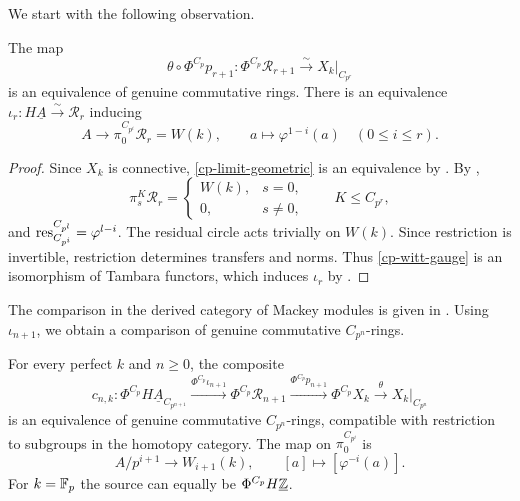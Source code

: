 We start with the following observation.

\begin{proposition}\label{prop:cp-restriction-limit}
The map
\begin{equation}\label{cp-limit-geometric}
\theta\circ\Phi^{C_p}p_{r+1}:
\Phi^{C_p}\mathcal R_{r+1}\xrightarrow{\sim}X_k|_{C_{p^r}}
\end{equation}
is an equivalence of genuine commutative rings. There is an equivalence
$\iota_r:H\underline A\xrightarrow{\sim}\mathcal R_r$ inducing
\begin{equation}\label{cp-witt-gauge}
A\longrightarrow\pi_0^{C_{p^i}}\mathcal R_r=W(k),
\qquad a\longmapsto\varphi^{1-i}(a)
\quad(0\le i\le r).
\end{equation}
\end{proposition}

\begin{proof}
Since $X_k$ is connective, \eqref{cp-limit-geometric} is an
equivalence by \cite[Proposition~5.2, the proof of Corollary~5.4,
and Corollary~5.13]{AN}.
By \cite[Theorem~6.14]{AN},
\[
\pi_s^K\mathcal R_r=
\begin{cases}W(k),&s=0,\\0,&s\ne0,\end{cases}
\qquad K\le C_{p^r},
\]
and $\operatorname{res}_{C_{p^i}}^{C_{p^l}}=\varphi^{l-i}$.
The residual circle acts trivially on $W(k)$.
Since restriction is invertible, restriction determines transfers
and norms. Thus \eqref{cp-witt-gauge} is an isomorphism of
Tambara functors, which induces $\iota_r$ by
\cite[Theorems~5.2--5.3]{Ullman}.
\end{proof}

The comparison in the derived category of Mackey modules is given in
\cite[Theorem~3]{Kriz}. Using $\iota_{n+1}$, we obtain a comparison of
genuine commutative $C_{p^n}$-rings.

\begin{proposition}
\label{prop:cp-normed-comparison}
For every perfect $k$ and $n\geq0$, the composite
\[
c_{n,k}:\Phi^{C_p}H\underline A_{C_{p^{n+1}}}
 \xrightarrow{\Phi^{C_p}\iota_{n+1}}\Phi^{C_p}\mathcal R_{n+1}
 \xrightarrow{\Phi^{C_p}p_{n+1}}\Phi^{C_p}X_k
 \xrightarrow{\theta}X_k|_{C_{p^n}}
\]
is an equivalence of genuine commutative $C_{p^n}$-rings, compatible
with restriction to subgroups in the homotopy category. The map on $\pi_0^{C_{p^i}}$ is
\begin{equation}\label{cp-finite-gauge}
A/p^{i+1}\longrightarrow W_{i+1}(k),\qquad
 [a]\longmapsto[\varphi^{-i}(a)].
\end{equation}
For $k=\mathbb F_p$ the source can equally be
$\Phi^{C_p}H\underline{\mathbb Z}$.
\end{proposition}

